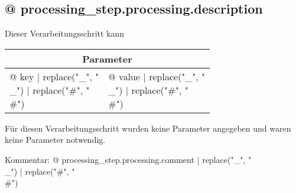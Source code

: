 \subsection{{@ processing_step.processing.description }}

Dieser Verarbeitungsschritt kann %

\vspace*{1ex}
\begin{tabular}{ll}
\toprule
\multicolumn{2}{c}{\textbf{Parameter}}
\\
\midrule
{@ key | replace("_", "\\_") | replace("#", "\\#") } & {@ value | replace("_", "\\_") | replace("#", "\\#") }
\\
\bottomrule
\end{tabular}
\vspace*{1ex}
Für diesen Verarbeitungsschritt wurden keine Parameter angegeben und waren keine Parameter notwendig.

Kommentar: {@ processing_step.processing.comment | replace("_", "\\_") | replace("#", "\\#") }
